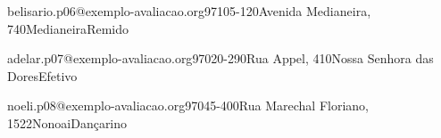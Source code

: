 \documentclass[11pt,a4paper]{article}
\begin{document}
%
  {belisario.p06@exemplo-avaliacao.org}{97105-120}{Avenida Medianeira, 740}{Medianeira}{Remido}

%
  {adelar.p07@exemplo-avaliacao.org}{97020-290}{Rua Appel, 410}{Nossa Senhora das Dores}{Efetivo}

%
  {noeli.p08@exemplo-avaliacao.org}{97045-400}{Rua Marechal Floriano, 1522}{Nonoai}{Dançarino}
\end{document}
